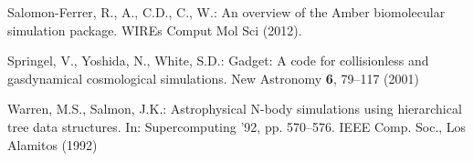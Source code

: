 \begin{thebibliography}{10}
{Salomon-Ferrer}, R., A., C.D., C., W.: {An overview of the Amber biomolecular
  simulation package}.
\newblock WIREs Comput Mol Sci  (2012).
\newblock {}

Springel, V., Yoshida, N., White, S.D.: Gadget: A code for collisionless and
  gasdynamical cosmological simulations.
\newblock New Astronomy \textbf{6}, 79--117 (2001)

Warren, M.S., Salmon, J.K.: Astrophysical {N}-body simulations using
  hierarchical tree data structures.
\newblock In: Supercomputing '92, pp. 570--576. IEEE Comp. Soc., Los Alamitos
  (1992)

\end{thebibliography}




